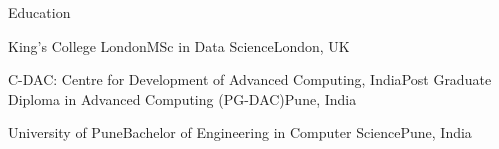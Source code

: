 \documentclass{resume} %
\begin{document}

\begin{rSection}{Education}
\begin{rSubsection}{King's College London}{}{MSc in Data Science}{London, UK}
\vspace{-.65cm}
\item[]
\end{rSubsection}
\begin{rSubsection}{C-DAC: Centre for Development of Advanced Computing, India}{}{Post Graduate Diploma in Advanced Computing (PG-DAC)}{Pune, India}
\vspace{-.65cm}
\item[]
\end{rSubsection}
\begin{rSubsection}{University of Pune}{}{Bachelor of Engineering in Computer Science}{Pune, India}
\vspace{-.65cm}
\item[]
\end{rSubsection}
\end{rSection}

\end{document}
